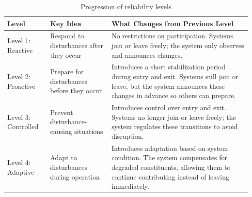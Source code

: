 \begin{table}[htp]
\centering
\footnotesize
\caption{Progression of reliability levels}
\label{tab:reliability-levels}
\begin{tabularx}{\textwidth}{p{3.5cm} p{4cm} X}
\toprule
\textbf{Level} & \textbf{Key Idea} & \textbf{What Changes from Previous Level} \\
\midrule

Level 1: Reactive 
& Respond to disturbances after they occur 
& No restrictions on participation. Systems join or leave freely; the system only observes and announces changes. \\

Level 2: Proactive 
& Prepare for disturbances before they occur 
& Introduces a short stabilization period during entry and exit. Systems still join or leave, but the system announces these changes in advance so others can prepare. \\

Level 3: Controlled 
& Prevent disturbance-causing situations 
& Introduces control over entry and exit. Systems no longer join or leave freely; the system regulates these transitions to avoid disruption. \\

Level 4: Adaptive 
& Adapt to disturbances during operation 
& Introduces adaptation based on system condition. The system compensates for degraded constituents, allowing them to continue contributing instead of leaving immediately. \\

\bottomrule
\end{tabularx}
\end{table}